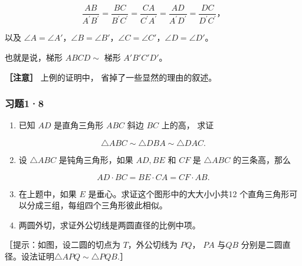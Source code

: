 \[
\frac {A B}{A ^ {\prime} B ^ {\prime}} = \frac {B C}{B ^ {\prime} C ^ {\prime}} = \frac {C A}{C ^ {\prime} A ^ {\prime}} = \frac {A D}{A ^ {\prime} D ^ {\prime}} = \frac {D C}{D ^ {\prime} C ^ {\prime}}\text{，}
\]

以及
\(\angle A = \angle A'\)，\(\angle B = \angle B'\)，\(\angle C = \angle C'\)，\(\angle D = \angle D'\)。

也就是说，梯形 \(ABCD \sim\) 梯形 \(A'B'C'D'\)。

\textbf{［注意］} 上例的证明中， 省掉了一些显然的理由的叙述。

\subsubsection{习题1·8}

\begin{enumerate}
\item
  已知 \(AD\) 是直角三角形 \(ABC\) 斜边 \(BC\) 上的高， 求证
\end{enumerate}

\[
\triangle A B C \sim \triangle D B A \sim \triangle D A C.
\]

\begin{enumerate}
\setcounter{enumi}{1}
\item
  设 \(\triangle ABC\) 是钝角三角形，如果 \(AD, BE\) 和 \(CF\) 是
  \(\triangle ABC\) 的三条高，那么
\end{enumerate}

\[
A D \cdot B C = B E \cdot C A = C F \cdot A B.
\]

\begin{enumerate}
\setcounter{enumi}{2}
\item
  在上题中，如果 \(E\) 是垂心。求证这个图形中的大大小小共12
  个直角三角形可以分成三组，每组四个三角形彼此相似。
\item
  两圆外切，求证外公切线是两圆直径的比例中项。
\end{enumerate}

［提示：如图，设二圆的切点为 \(T\)，外公切线为 \(PQ\)， \(PA\) 与\(QB\)
分别是二圆直径。设法证明\(\triangle APQ\sim \triangle PQB.\)］

